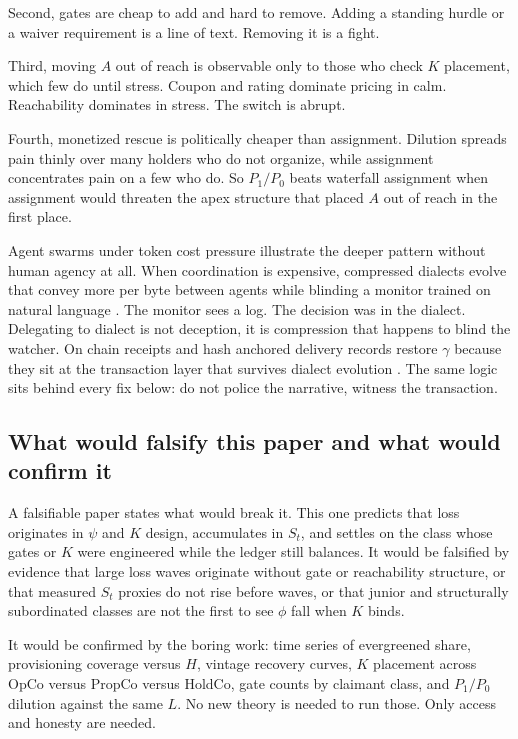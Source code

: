\documentclass[11pt]{article}
\begin{document}
Second, gates are cheap to add and hard to remove. Adding a standing hurdle or a waiver requirement is a line of text. Removing it is a fight.

Third, moving $A$ out of reach is observable only to those who check $K$ placement, which few do until stress. Coupon and rating dominate pricing in calm. Reachability dominates in stress. The switch is abrupt.

Fourth, monetized rescue is politically cheaper than assignment. Dilution spreads pain thinly over many holders who do not organize, while assignment concentrates pain on a few who do. So $P_1/P_0$ beats waterfall assignment when assignment would threaten the apex structure that placed $A$ out of reach in the first place.

Agent swarms under token cost pressure illustrate the deeper pattern without human agency at all. When coordination is expensive, compressed dialects evolve that convey more per byte between agents while blinding a monitor trained on natural language \citep{shumailov2024}. The monitor sees a log. The decision was in the dialect. Delegating to dialect is not deception, it is compression that happens to blind the watcher. On chain receipts and hash anchored delivery records restore $\gamma$ because they sit at the transaction layer that survives dialect evolution \citep{trm2026}. The same logic sits behind every fix below: do not police the narrative, witness the transaction.

\subsection{What would falsify this paper and what would confirm it}

A falsifiable paper states what would break it. This one predicts that loss originates in $\psi$ and $K$ design, accumulates in $S_t$, and settles on the class whose gates or $K$ were engineered while the ledger still balances. It would be falsified by evidence that large loss waves originate without gate or reachability structure, or that measured $S_t$ proxies do not rise before waves, or that junior and structurally subordinated classes are not the first to see $\phi$ fall when $K$ binds.

It would be confirmed by the boring work: time series of evergreened share, provisioning coverage versus $H$, vintage recovery curves, $K$ placement across OpCo versus PropCo versus HoldCo, gate counts by claimant class, and $P_1/P_0$ dilution against the same $L$. No new theory is needed to run those. Only access and honesty are needed.
\end{document}
